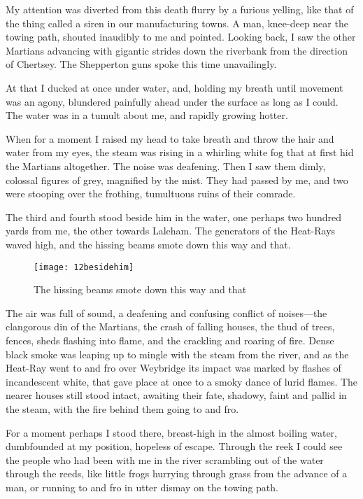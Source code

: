 My attention was diverted from this death flurry by a furious yelling, like that of the thing called a siren in our manufacturing towns. A man, knee-deep near the towing path, shouted inaudibly to me and pointed. Looking back, I saw the other Martians advancing with gigantic strides down the riverbank from the direction of Chertsey. The Shepperton guns spoke this time unavailingly.

At that I ducked at once under water, and, holding my breath until movement was an agony, blundered painfully ahead under the surface as long as I could. The water was in a tumult about me, and rapidly growing hotter.

When for a moment I raised my head to take breath and throw the hair and water from my eyes, the steam was rising in a whirling white fog that at first hid the Martians altogether. The noise was deafening. Then I saw them dimly, colossal figures of grey, magnified by the mist. They had passed by me, and two were stooping over the frothing, tumultuous ruins of their comrade.

The third and fourth stood beside him in the water, one perhaps two hundred yards from me, the other towards Laleham. The generators of the Heat-Rays waved high, and the hissing beams smote down this way and that.


\begin{figure}[tbp]
\centering
\texttt{[image: 12besidehim]}
\caption{The hissing beams smote down this way and that}
\end{figure}

The air was full of sound, a deafening and confusing conflict of noises—the clangorous din of the Martians, the crash of falling houses, the thud of trees, fences, sheds flashing into flame, and the crackling and roaring of fire. Dense black smoke was leaping up to mingle with the steam from the river, and as the Heat-Ray went to and fro over Weybridge its impact was marked by flashes of incandescent white, that gave place at once to a smoky dance of lurid flames. The nearer houses still stood intact, awaiting their fate, shadowy, faint and pallid in the steam, with the fire behind them going to and fro.

For a moment perhaps I stood there, breast-high in the almost boiling water, dumbfounded at my position, hopeless of escape. Through the reek I could see the people who had been with me in the river scrambling out of the water through the reeds, like little frogs hurrying through grass from the advance of a man, or running to and fro in utter dismay on the towing path.

